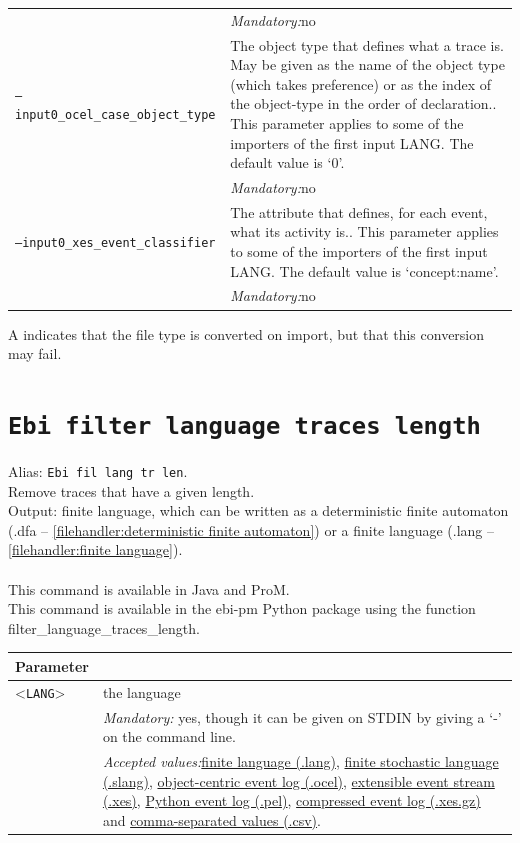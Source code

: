{\begin{tabularx}{\linewidth}{lX}
&\textit{Mandatory:}\quad no\\
\texttt{--input0\_ocel\_case\_object\_type} & The object type that defines what a trace is. May be given as the name of the object type (which takes preference) or as the index of the object-type in the order of declaration.. This parameter applies to some of the importers of the first input LANG. The default value is `0'.\\
&\textit{Mandatory:}\quad no\\
\texttt{--input0\_xes\_event\_classifier} & The attribute that defines, for each event, what its activity is.. This parameter applies to some of the importers of the first input LANG. The default value is `concept:name'.\\
&\textit{Mandatory:}\quad no\\
\bottomrule
\end{tabularx}
A \textdagger{} indicates that the file type is converted on import, but that this conversion may fail.
\clearpage\section{\texttt{Ebi filter language traces length}}
\label{command:Ebi filter language traces length}
Alias: \texttt{Ebi fil lang tr len}.\\
Remove traces that have a given length.\\
\noindent Output: finite language, which can be written as a deterministic finite automaton (.dfa -- \cref{filehandler:deterministic finite automaton}) or a finite language (.lang -- \cref{filehandler:finite language}).\\
\\This command is available in Java and ProM.
\\This command is available in the ebi-pm Python package using the function filter\_language\_traces\_length.
\begin{tabularx}{\linewidth}{lX}
\toprule
Parameter \\\midrule
<\texttt{LANG}>&the language\\
&\textit{Mandatory:} \quad yes, though it can be given on STDIN by giving a `-' on the command line.\\
&\textit{Accepted values:}\quad \hyperref[filehandler:finite language]{finite language (.lang)}, \hyperref[filehandler:finite stochastic language]{finite stochastic language (.slang)}, \hyperref[filehandler:object-centric event log]{object-centric event log (.ocel)}, \hyperref[filehandler:extensible event stream]{extensible event stream (.xes)}, \hyperref[filehandler:Python event log]{Python event log (.pel)}, \hyperref[filehandler:compressed event log]{compressed event log (.xes.gz)} and \hyperref[filehandler:comma-separated values]{comma-separated values (.csv)}.\\

\end{tabularx}}
